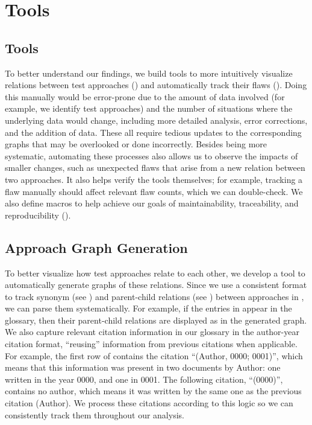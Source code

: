 \ifnotpaper
    \section{Tools}
\else
    \subsection{Tools}
\fi
\label{tools}

\ifnotpaper
    To better understand our findings, we build tools to more intuitively
    visualize relations between test approaches () and
    automatically track their flaws (). Doing
    this manually would be error-prone due to the amount of data involved (for
    example, we identify \approachCount{} test approaches) and the number of
    situations where the underlying data would change, including more detailed
    analysis, error corrections, and the addition of data. These all require
    tedious updates to the corresponding graphs that may be overlooked or done
    incorrectly. Besides being more systematic, automating these processes also
    allows us to observe the impacts of smaller changes, such as unexpected
    flaws that arise from a new relation between two approaches. It
    also helps verify the tools themselves; for example, tracking a flaw
    manually should affect relevant flaw counts, which we can double-check.
    We also define macros to help achieve our goals of
    maintainability, traceability, and reproducibility ().

    \subsection{Approach Graph Generation}
    \label{graph-gen}
\fi

To better visualize how test approaches relate to each other, we
develop a tool to automatically generate graphs of these relations.
\ifnotpaper Since we use a consistent format to track synonym
    (see ) and parent-child relations (see )
    between approaches in \ourApproachGlossary{}, we can parse them
    systematically. For example, if the entries in 
    appear in the glossary, then their parent-child relations are displayed as
     in the generated graph. We also capture relevant
    citation information in our glossary in the author-year citation format,
    ``reusing'' information from previous citations when applicable.
    For example, the first row of 
    contains the citation ``(Author, 0000; 0001)'', which means that this
    information was present in two documents by Author: one written in
    the year 0000, and one in 0001. The following citation, ``(0000)'',
    contains no author, which means it was written by the same one as the
    previous citation (Author). We process these citations according to this
    logic  so we can
    consistently track them throughout our analysis.

